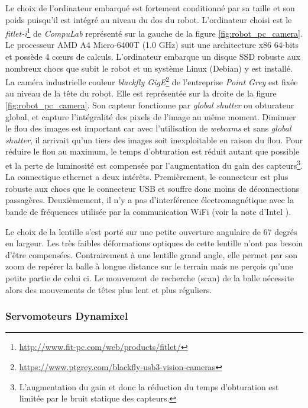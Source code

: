 Le choix de l'ordinateur embarqué est fortement conditionné par sa taille
et son poids puisqu'il est intégré au niveau du dos du robot.
L'ordinateur choisi est le \textit{fitlet-i}\footnote{\url{http://www.fit-pc.com/web/products/fitlet/}}
de \textit{CompuLab} représenté sur la gauche de la figure \ref{fig:robot_pc_camera}.
Le processeur AMD A4 Micro-6400T (1.0 GHz) suit une architecture x86 64-bits 
et possède 4 cœurs de calculs.
L'ordinateur embarque un disque SSD robuste aux nombreux chocs que subit le robot
et un système Linux (Debian) y est installé.\\

La caméra industrielle couleur 
\textit{blackfly GigE}\footnote{\url{https://www.ptgrey.com/blackfly-usb3-vision-cameras}}
de l'entreprise \textit{Point Grey} est fixée au niveau de la tête du robot.
Elle est représentée sur la droite de la figure \ref{fig:robot_pc_camera}.
Son capteur fonctionne par \textit{global shutter} ou obturateur global, 
et capture l'intégralité des pixels de l'image au même moment.
Diminuer le flou des images est important car avec l'utilisation de \textit{webcams}
et sans \textit{global shutter}, il arrivait qu'un tiers des images soit
inexploitable en raison du flou.
Pour réduire le flou au maximum, le temps d'obturation est réduit autant que possible
et la perte de luminosité est compensée par l'augmentation 
du gain des capteurs\footnote{L'augmentation du gain et donc la réduction 
du temps d'obturation est limitée par le bruit statique des capteurs.}.
La connectique ethernet a deux intérêts. 
Premièrement, le connecteur est plus robuste aux chocs que le connecteur USB
et souffre donc moins de déconnections passagères.
Deuxièmement, il n'y a pas d'interférence électromagnétique avec la bande
de fréquences utilisée par la communication WiFi (voir la note d'Intel \cite{USB3Wifi}).

Le choix de la lentille s'est porté sur une petite ouverture angulaire de $67$ degrés en largeur.
Les très faibles déformations optiques de cette lentille n'ont pas besoin d'être compensées.
Contrairement à une lentille grand angle, elle permet par son \og zoom \fg de 
repérer la balle à longue distance sur le terrain mais ne perçois qu'une petite partie de celui ci.
Le mouvement de recherche (scan) de la balle nécessite alors des mouvements de têtes plus 
lent et plus réguliers.

\subsubsection{Servomoteurs Dynamixel}

